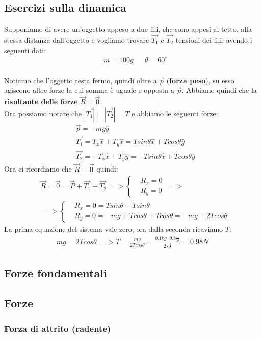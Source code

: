     \subsection{Esercizi sulla dinamica}
        Supponiamo di avere un'oggetto appeso a due fili, che sono appesi al tetto, alla stessa distanza dall'oggetto e vogliamo trovare $\vec{T_1}$ e $\vec{T_2}$ tensioni dei fili, avendo i seguenti dati:
        \begin{align*}
            &m=100g&&\theta=60^{\circ}\\
        \end{align*}


        Notiamo che l'oggetto resta fermo, quindi oltre a $\vec{p}$ (\textbf{forza peso}), su esso agiscono altre forze la cui somma è uguale e opposta a $\vec{p}$. Abbiamo quindi che la \textbf{risultante delle forze} $\vec{R}=\vec{0}$.\\
        Ora possiamo notare che $|\vec{T_1}|=|\vec{T_2}|=T$ e abbiamo le seguenti forze:
        \begin{align*}
            &\vec{p}=-mg\hat{y}\\
            &\vec{T_1}=T_x\hat{x}+T_y\hat{x}=Tsin\theta \hat{x}+Tcos\theta \hat{y}\\
            &\vec{T_2}=-T_x\hat{x}+T_y\hat{y}=-Tsin\theta \hat{x}+Tcos\theta \hat{y}
        \end{align*}
        Ora ci ricordiamo che $\vec{R}=\vec{0}$ quindi:
        \begin{align*}
            &\vec{R}=\vec{0}=\vec{P}+\vec{T_1}+\vec{T_2}=>
            \begin{cases}
                &R_x=0\\
                &R_y=0
            \end{cases}=>\\
            &=>
            \begin{cases}
                &R_x=0=Tsin\theta-Tsin\theta\\
                &R_y=0=-mg+Tcos\theta+Tcos\theta=-mg+2Tcos\theta
            \end{cases}
            \end{align*}
                La prima equazione del sistema vale zero, ora dalla seconda ricaviamo $T$:
            \begin{align*}
            mg=2Tcos\theta=>T=\frac{mg}{2Tcos\theta}=\frac{0.1kg\cdot 9.8\frac{m}{s^2}}{2\cdot\frac{1}{2}}=0.98N
        \end{align*}

    \subsection{Forze fondamentali}






    \subsection{Forze}








        \subsubsection{Forza di attrito (radente)}
